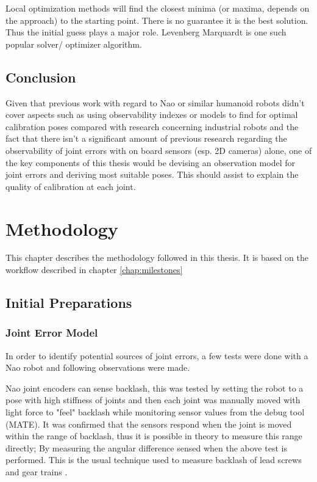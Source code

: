 \documentclass[english, printversion, nomenclature, notitle]{tuvisionthesis} %
\begin{document}
Local optimization methods will find the closest minima (or maxima, depends on the approach) to the starting point. There is no guarantee it is the best solution. Thus the initial guess plays a major role. Levenberg Marquardt \cite{lev-mar} is one such popular solver/ optimizer algorithm.

\section{Conclusion}
Given that previous work with regard to Nao or similar humanoid robots didn't cover aspects such as using observability indexes or models to find for optimal calibration poses compared with research concerning industrial robots and the fact that there isn't a significant amount of previous research regarding the observability of joint errors with on board sensors (esp. 2D cameras) alone, one of the key components of this thesis would be devising an observation model for joint errors and deriving most suitable poses. This should assist to explain the quality of calibration at each joint.

\chapter{Methodology}
\label{chap:methodology}
This chapter describes the methodology followed in this thesis. It is based on the workflow described in chapter \cref{chap:milestones}

\section{Initial Preparations}

\subsection{Joint Error Model}
\label{subsec:initial_joint_error}

In order to identify potential sources of joint errors, a few tests were done with a Nao robot and following observations were made.

Nao joint encoders can sense backlash, this was tested by setting the robot to a pose with high stiffness of joints and then each joint was manually moved with light force to "feel" backlash while monitoring sensor values from the debug tool (MATE). It was confirmed that the sensors respond when the joint is moved within the range of backlash, thus it is possible in theory to measure this range directly; By measuring the angular difference sensed when the above test is performed. This is the usual technique used to measure backlash of lead screws and gear trains \cite{SCHWENKE2008660, ferney1995development}.
\end{document}
